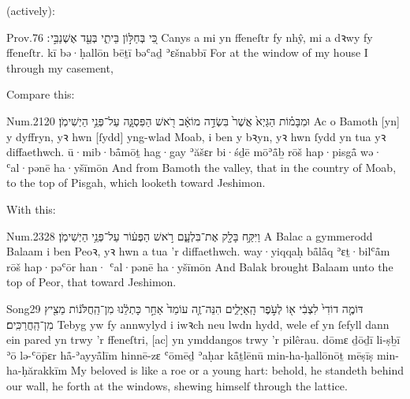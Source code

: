  (actively):
\begin{example}{Prov.}{7}{6}{}{}
	\quoling
	{כִּ֭י בְּחַלּ֣וֹן בֵּיתִ֑י בְּעַ֖ד אֶשְׁנַבִּ֣י ׃}
	{Canys a mi yn ffeneſtr fy nhŷ, mi a  dꝛwy fy ffeneſtr.}
	{kī bə·ḥallōn bēṯī bəʿaḏ ʾɛšnabbī }
	{For at the window of my house I  through my casement,}
\end{example}

Compare this:
\begin{example}{Num.}{21}{20}{}{}
	\quoling
	{וּמִבָּמ֗וֹת הַגַּיְא֙ אֲשֶׁר֙ בִּשְׂדֵ֣ה מוֹאָ֔ב רֹ֖אשׁ הַפִּסְגָּ֑ה  עַל־פְּנֵ֥י הַיְשִׁימֹֽן׃}
	{Ac o Bamoth [yn] y dyffryn, yꝛ hwn [ſydd] yng-wlad Moab, i ben y bꝛyn, yꝛ hwn ſydd yn  tua yꝛ diffaethwch.}
	{ū·mib·bå̄mōṯ hag·gay ʾăšɛr bi·śḏē mōʾå̄ḇ rōš hap·pisgå̄ wə· ʿal·pənē ha·yšīmōn}
	{And from Bamoth  the valley, that  in the country of Moab, to the top of Pisgah, which looketh toward Jeshimon.}
\end{example}

With this:
\begin{example}{Num.}{23}{28}{}{}
	\quoling
	{וַיִּקַּ֥ח בָּלָ֖ק אֶת־בִּלְעָ֑ם רֹ֣אשׁ הַפְּע֔וֹר  עַל־פְּנֵ֥י הַיְשִׁימֹֽן׃}
	{A Balac a gymmerodd Balaam i ben Peoꝛ, yꝛ hwn a  tua ’r diffaethwch.}
	{way·yiqqaḥ bå̄lå̄q ʾɛṯ·bilʿå̄m rōš hap·pəʿōr han· ʿal·pənē ha·yšīmōn}
	{And Balak brought Balaam unto the top of Peor, that  toward Jeshimon.}
\end{example}







\begin{example}{Song}{2}{9}{}{}
	\quoling
	{דּוֹמֶ֤ה דוֹדִי֙ לִצְבִ֔י א֖וֹ לְעֹ֣פֶר הָֽאַיָּלִ֑ים הִנֵּה־זֶ֤ה עוֹמֵד֙ אַחַ֣ר כָּתְלֵ֔נוּ  מִן־הַֽחֲלֹּנ֔וֹת מֵצִ֖יץ מִן־הַֽחֲרַכִּֽים׃}
	{Tebyg yw fy annwylyd i iwꝛch neu lwdn hydd, wele ef yn ſefyll dann ein pared yn  trwy ’r ffeneſtri, [ac] yn ymddangos trwy ’r pilêrau.}
	{dōmɛ ḏōḏī li-ṣḇī ʾō lə-ʿōp̄ɛr hå̄-ʾayyå̄līm hinnē-zɛ ʿōmēḏ ʾaḥar kå̄ṯlēnū  min-ha-ḥallōnōṯ mēṣīṣ min-ha-ḥărakkīm}
	{My beloved is like a roe or a young hart: behold, he standeth behind our wall, he  forth at the windows, shewing himself through the lattice.}
\end{example}



